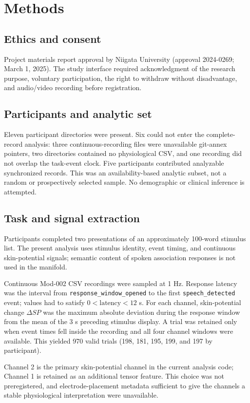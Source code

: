 \documentclass[a4paper,12pt]{article}
\begin{document}
\section{Methods}
\subsection{Ethics and consent}
Project materials report approval by Niigata University (approval 2024-0269; March 1, 2025). The study interface required acknowledgment of the research purpose, voluntary participation, the right to withdraw without disadvantage, and audio/video recording before registration.

\subsection{Participants and analytic set}
Eleven participant directories were present. Six could not enter the complete-record analysis: three continuous-recording files were unavailable git-annex pointers, two directories contained no physiological CSV, and one recording did not overlap the task-event clock. Five participants contributed analyzable synchronized records. This was an availability-based analytic subset, not a random or prospectively selected sample. No demographic or clinical inference is attempted.

\subsection{Task and signal extraction}
Participants completed two presentations of an approximately 100-word stimulus list. The present analysis uses stimulus identity, event timing, and continuous skin-potential signals; semantic content of spoken association responses is not used in the manifold.

Continuous Mod-002 CSV recordings were sampled at 1 Hz. Response latency was the interval from \texttt{response\_window\_opened} to the first \texttt{speech\_detected} event; values had to satisfy $0<\mathrm{latency}<12$ s. For each channel, skin-potential change $\Delta SP$ was the maximum absolute deviation during the response window from the mean of the 3 s preceding stimulus display. A trial was retained only when event times fell inside the recording and all four channel windows were available. This yielded 970 valid trials (198, 181, 195, 199, and 197 by participant).

Channel 2 is the primary skin-potential channel in the current analysis code; Channel 1 is retained as an additional tensor feature. This choice was not preregistered, and electrode-placement metadata sufficient to give the channels a stable physiological interpretation were unavailable.
\end{document}
